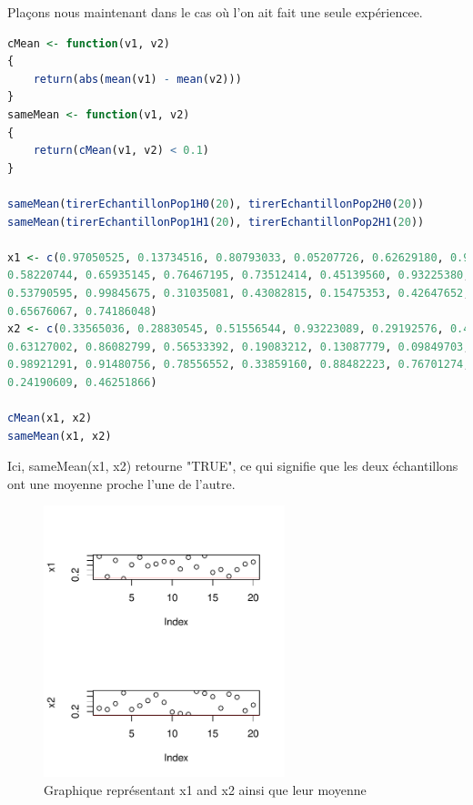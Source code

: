 Plaçons nous maintenant dans le cas où l'on ait fait une seule expériencee.


\begin{lstlisting}[language=R]
cMean <- function(v1, v2)
{
	return(abs(mean(v1) - mean(v2)))
}
sameMean <- function(v1, v2)
{
	return(cMean(v1, v2) < 0.1)
}

sameMean(tirerEchantillonPop1H0(20), tirerEchantillonPop2H0(20))
sameMean(tirerEchantillonPop1H1(20), tirerEchantillonPop2H1(20))

x1 <- c(0.97050525, 0.13734516, 0.80793033, 0.05207726, 0.62629180, 0.93485856,
0.58220744, 0.65935145, 0.76467195, 0.73512414, 0.45139560, 0.93225380,
0.53790595, 0.99845675, 0.31035081, 0.43082815, 0.15475353, 0.42647652,
0.65676067, 0.74186048)
x2 <- c(0.33565036, 0.28830545, 0.51556544, 0.93223089, 0.29192576, 0.43505823,
0.63127002, 0.86082799, 0.56533392, 0.19083212, 0.13087779, 0.09849703,
0.98921291, 0.91480756, 0.78556552, 0.33859160, 0.88482223, 0.76701274,
0.24190609, 0.46251866)

cMean(x1, x2)
sameMean(x1, x2)
\end{lstlisting}

Ici, sameMean(x1, x2) retourne "TRUE", ce qui signifie que les deux échantillons ont une moyenne proche l'une de l'autre.

\begin{figure}[H]
	\begin{center}
		\includegraphics[width=7cm]{diagrams/x1-x2-1.pdf}
		\caption{Graphique représentant x1 and x2 ainsi que leur moyenne}
		\label{fig:x1-x2-1}
	\end{center}
\end{figure}

